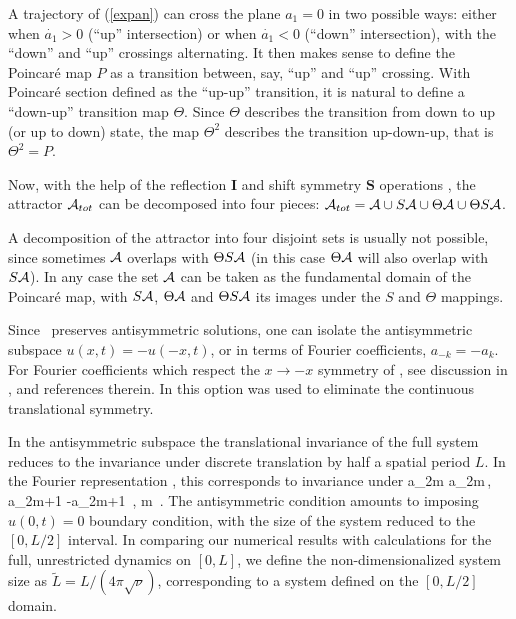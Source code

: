 A trajectory of
 (\ref{expan}) can cross the plane $a_1=0$ in two possible ways:
 either when
$\dot{a_1}>0$ (``up'' intersection)
or when  $\dot{a_1}<0$ (``down'' intersection),
 with the ``down'' and ``up'' crossings
alternating.
It then makes sense to define the  Poincar\'e map $P$ as a transition between,
say, ``up'' and ``up'' crossing.
With  Poincar\'e section defined as the ``up-up'' transition,
it is natural to define a ``down-up'' transition map $\Theta$. Since
$\Theta$ describes the transition from down to up (or up to down) state,
the map $\Theta^2$ describes the transition  up-down-up, that is
$\Theta^2=P$.

Now, with the help of the 
reflection $\mathbf{I}$ and shift symmetry $ \mathbf{S}$
operations
,
the  attractor ${\cal A}_{tot}$ can be
decomposed into four pieces:
 ${\cal A}_{tot}={\cal A} \cup S {\cal A}  \cup \Theta {\cal A}
  \cup \Theta S {\cal A} $. 

A decomposition
of the attractor into four disjoint sets
is usually not possible, since sometimes $ {\cal A}$ overlaps with
$\Theta S{\cal A} $ (in this case $\Theta  {\cal A}$ will also  overlap with
$S {\cal A} $).
In any case  the set $ {\cal A}$ can be taken as
the fundamental
domain of the Poincar{\'e} map, with $S  {\cal A} $,
$\Theta  {\cal A} $ and $\Theta S  {\cal A} $ its images under the
$S$ and $\Theta$ mappings.



Since \KSe\ preserves
antisymmetric solutions, one can isolate the antisymmetric
subspace 
$u(x,t)=-u(-x,t)$, or in terms of Fourier coefficients,
$a_{-k}= - a_k$. 
For Fourier coefficients which respect the $x \to -x$ symmetry of
\KSe, see discussion in ,
and references therein.
In  
this option was used to eliminate
the continuous translational symmetry.

In the antisymmetric subspace the translational 
invariance of the full system reduces
to the invariance under discrete
translation by half a spatial period $L$.
In the Fourier representation , 
this corresponds to invariance under 
\beq
a_{2m} \to a_{2m}\,, a_{2m+1} \to -a_{2m+1}
\,, m \in {}
\,.
The antisymmetric condition amounts to imposing
$u(0,t)=0$ boundary condition, with
the size of the system reduced to
the $[0,L/2]$ interval. In
comparing our numerical results with %
calculations for
the full, unrestricted dynamics on $[0,L]$, we define
the non-dimensionalized system size as
$\tilde{L} = {L}/{(4 \pi \sqrt{\nu})}$,
corresponding to a system defined on the
$[0,L/2]$ domain. 

